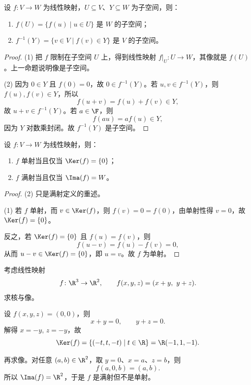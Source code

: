 \begin{proposition}
设 $f\colon V\to W$ 为线性映射，$U\subseteq V$、$Y\subseteq W$ 为子空间，则：
\begin{enumerate}[label=\textnormal{(\arabic*)}]
  \item $f(U)=\{f(u)\mid u\in U\}$ 是 $W$ 的子空间；
  \item $f^{-1}(Y)=\{v\in V\mid f(v)\in Y\}$ 是 $V$ 的子空间。
\end{enumerate}
\end{proposition}

\begin{proof}
(1) 把 $f$ 限制在子空间 $U$ 上，得到线性映射 $f|_U\colon U\to W$，其像就是 $f(U)$。上一命题说明像是子空间。

(2) 因为 $0\in Y$ 且 $f(0)=0$，故 $0\in f^{-1}(Y)$。若 $u,v\in f^{-1}(Y)$，则 $f(u),f(v)\in Y$，所以
\[
  f(u+v)=f(u)+f(v)\in Y,
\]
故 $u+v\in f^{-1}(Y)$。若 $a\in\F$，则
\[
  f(au)=af(u)\in Y,
\]
因为 $Y$ 对数乘封闭。故 $f^{-1}(Y)$ 是子空间。
\end{proof}

\begin{proposition}
设 $f\colon V\to W$ 为线性映射，则：
\begin{enumerate}[label=\textnormal{(\arabic*)}]
  \item $f$ 单射当且仅当 $\Ker(f)=\{0\}$；
  \item $f$ 满射当且仅当 $\Ima(f)=W$。
\end{enumerate}
\end{proposition}

\begin{proof}
(2) 只是满射定义的重述。

(1) 若 $f$ 单射，而 $v\in\Ker(f)$，则 $f(v)=0=f(0)$，由单射性得 $v=0$，故 $\Ker(f)=\{0\}$。

反之，若 $\Ker(f)=\{0\}$ 且 $f(u)=f(v)$，则
\[
  f(u-v)=f(u)-f(v)=0,
\]
从而 $u-v\in\Ker(f)=\{0\}$，即 $u=v$。故 $f$ 为单射。
\end{proof}

\begin{example}
考虑线性映射
\[
  f\colon \R^3\to\R^2,
  \qquad
  f(x,y,z)=(x+y,\ y+z).
\]
求核与像。

设 $f(x,y,z)=(0,0)$，则
\[
  x+y=0,\qquad y+z=0.
\]
解得 $x=-y$, $z=-y$，故
\[
  \Ker(f)=\{(-t,t,-t)\mid t\in\R\}=\R(-1,1,-1).
\]

再求像。对任意 $(a,b)\in\R^2$，取 $y=0$、$x=a$、$z=b$，则
\[
  f(a,0,b)=(a,b).
\]
所以 $\Ima(f)=\R^2$，于是 $f$ 是满射但不是单射。
\end{example}

